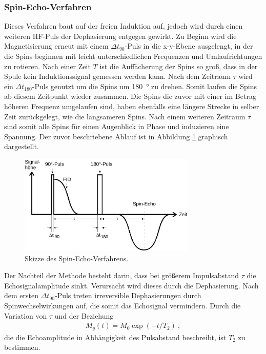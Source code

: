 \subsubsection{Spin-Echo-Verfahren}
Dieses Verfahren baut auf der freien Induktion auf, jedoch wird durch einen weiteren HF-Puls der Dephasierung entgegen gewirkt. Zu Beginn wird die Magnetisierung erneut mit einem $\Delta t_{90}$-Puls in die x-y-Ebene ausgelengt, in der die Spins beginnen mit leicht unterschiedlichen Frequenzen und Umlaufrichtungen zu rotieren. Nach einer Zeit $T$ ist die Auffächerung der Spins so groß, dass in der Spule kein Induktionssignal gemessen werden kann. Nach dem Zeitraum $\tau$  wird ein $\Delta t_{180}$-Puls genutzt um die Spins um \SI{180}{\degree} zu drehen. Somit laufen die Spins ab diesem Zeitpunkt wieder zusammen. Die Spins die zuvor mit einer im Betrag höheren Frequenz umgelaufen sind, haben ebenfalls eine längere Strecke in selber Zeit zurückgelegt, wie die langsameren Spins. Nach einem weiteren Zeitraum $\tau$ sind somit alle Spins für einen Augenblick in Phase und induzieren eine Spannung. Der zuvor beschriebene Ablauf ist in Abbildung \ref{fig:plot2} graphisch dargestellt.


\begin{figure}
  \centering
  \includegraphics[width=0.75\textwidth]{ressources/hahn_echo.png}
  \caption{Skizze des Spin-Echo-Verfahrens.}
  \label{fig:plot2}
\end{figure}

Der Nachteil der Methode besteht darin, dass bei größerem Impulsabstand $\tau$ die Echosignalamplitude sinkt. Verursacht wird dieses durch die Dephasierung. Nach dem ersten $\Delta t_{90}$-Puls treten irreversible Dephasierungen durch Spinwechselwirkungen auf, die somit das Echosignal vermindern. Durch die Variation von $\tau$ und der Beziehung
\begin{align}
	M_y(t)=M_0\exp{(-t/T_2)} \:,
	\label{eq:11}
\end{align}
die die Echoamplitude in Abhängigkeit des Pulsabstand beschreibt, ist $T_2$ zu bestimmen.

